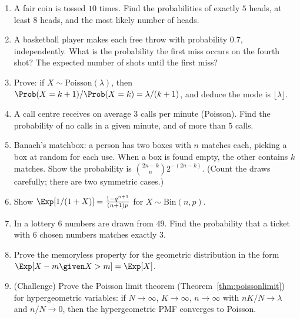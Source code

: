 \begin{enumerate}
\item A fair coin is tossed $10$ times. Find the probabilities of exactly $5$
heads, at least $8$ heads, and the most likely number of heads.
\item A basketball player makes each free throw with probability $0.7$,
independently. What is the probability the first miss occurs on the fourth shot?
The expected number of shots until the first miss?
\item Prove: if $X\sim\mathrm{Poisson}(\lambda)$, then $\Prob(X=k+1)/\Prob(X=k)=
\lambda/(k+1)$, and deduce the mode is $\lfloor\lambda\rfloor$.
\item A call centre receives on average $3$ calls per minute (Poisson). Find the
probability of no calls in a given minute, and of more than $5$ calls.
\item Banach's matchbox: a person has two boxes with $n$ matches each, picking a
box at random for each use. When a box is found empty, the other contains $k$
matches. Show the probability is
$\binom{2n-k}{n}2^{-(2n-k)}$. (Count the draws carefully; there are two
symmetric cases.)
\item Show $\Exp[1/(1+X)]=\frac{1-q^{n+1}}{(n+1)p}$ for $X\sim\mathrm{Bin}(n,p)$.
\item In a lottery $6$ numbers are drawn from $49$. Find the probability that a
ticket with $6$ chosen numbers matches exactly $3$.
\item Prove the memoryless property for the geometric distribution in the form
$\Exp[X-m\given X>m]=\Exp[X]$.
\item (Challenge) Prove the Poisson limit theorem (Theorem~\ref{thm:poissonlimit})
for hypergeometric variables: if $N\to\infty$, $K\to\infty$, $n\to\infty$ with
$nK/N\to\lambda$ and $n/N\to0$, then the hypergeometric PMF converges to Poisson.
\end{enumerate}
